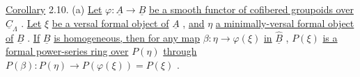 \begin{center}
\end{center}
\underline{Corollary} 2.10.  (a) \underline{Let} $\varphi : \underline{A} \to \underline{B}$ \underline{be a smooth functor of cofibered groupoids over} $\underline{C}_{\Lambda}$ . \underline{Let} $\xi$ \underline{be a versal formal object of} $\underline{A}$ , \underline{and} $\eta$ \underline{a minimally-versal formal object of} $\underline{B}$ . \underline{If} $\underline{B}$ \underline{is homogeneous, then for any map} $\beta : \eta \to \varphi(\xi)$ \underline{in} $\underline{\hat{B}}$ , $P(\xi)$ \underline{is a formal power-series ring over} $P(\eta)$ \underline{through} $P(\beta) : P(\eta) \to P(\varphi(\xi)) = P(\xi)$ .

